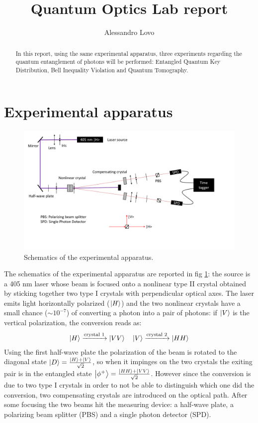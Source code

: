 \documentclass[a4paper, 11pt]{article}
\begin{document}
\title{Quantum Optics Lab report}
\author{Alessandro Lovo}

\maketitle

\begin{abstract}
  In this report, using the same experimental apparatus, three experiments regarding the quantum entanglement of photons will be performed: Entangled Quantum Key Distribution, Bell Inequality Violation and Quantum Tomography.
\end{abstract}


\section{Experimental apparatus}
  \begin{figure}[H]
    \includegraphics[width=1.0\textwidth]{img/apparatus.pdf}
    \caption{Schematics of the experimental apparatus.}
    \label{fig:apparatus}
  \end{figure}
  The schematics of the experimental apparatus are reported in fig \ref{fig:apparatus}: the source is a 405 \si{\nano\meter} laser whose beam is focused onto a nonlinear type II crystal obtained by sticking together two type I crystals with perpendicular optical axes. The laser emits light horizontally polarized ($\ket{H}$) and the two nonlinear crystals have a small chance ($\sim 10^{-7}$) of converting a photon into a pair of photons: if $\ket{V}$ is the vertical polarization, the conversion reads as:
  \begin{gather*}
    \ket{H} \xrightarrow[]{\text{crystal 1}} \ket{VV} \quad
    \ket{V} \xrightarrow[]{\text{crystal 2}} \ket{HH}
  \end{gather*}
  Using the first half-wave plate the polarization of the beam is rotated to the diagonal state $\ket{D} = \frac{\ket{H} + \ket{V}}{\sqrt{2}}$, so when it impinges on the two crystals the exiting pair is in the entangled state $\ket{\phi^+} = \frac{\ket{HH} + \ket{VV}}{\sqrt{2}}$. However since the conversion is due to two type I crystals in order to not be able to distinguish which one did the conversion, two compensating crystals are introduced on the optical path. After some focusing the two beams hit the measuring device: a half-wave plate, a polarizing beam splitter (PBS) and a single photon detector (SPD).
\end{document}
